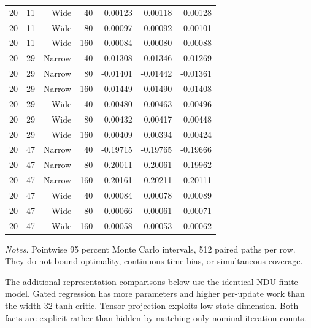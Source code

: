 \begin{small}
\begin{longtable}{lrrrrrr}
20 & 11 & Wide & 40 & 0.00123 & 0.00118 & 0.00128 \\
20 & 11 & Wide & 80 & 0.00097 & 0.00092 & 0.00101 \\
20 & 11 & Wide & 160 & 0.00084 & 0.00080 & 0.00088 \\
20 & 29 & Narrow & 40 & -0.01308 & -0.01346 & -0.01269 \\
20 & 29 & Narrow & 80 & -0.01401 & -0.01442 & -0.01361 \\
20 & 29 & Narrow & 160 & -0.01449 & -0.01490 & -0.01408 \\
20 & 29 & Wide & 40 & 0.00480 & 0.00463 & 0.00496 \\
20 & 29 & Wide & 80 & 0.00432 & 0.00417 & 0.00448 \\
20 & 29 & Wide & 160 & 0.00409 & 0.00394 & 0.00424 \\
20 & 47 & Narrow & 40 & -0.19715 & -0.19765 & -0.19666 \\
20 & 47 & Narrow & 80 & -0.20011 & -0.20061 & -0.19962 \\
20 & 47 & Narrow & 160 & -0.20161 & -0.20211 & -0.20111 \\
20 & 47 & Wide & 40 & 0.00084 & 0.00078 & 0.00089 \\
20 & 47 & Wide & 80 & 0.00066 & 0.00061 & 0.00071 \\
20 & 47 & Wide & 160 & 0.00058 & 0.00053 & 0.00062 \\
\bottomrule\end{longtable}\end{small}
\noindent\textit{Notes.} Pointwise 95 percent Monte Carlo intervals, 512 paired paths per row. They do not bound optimality, continuous-time bias, or simultaneous coverage.


The additional representation comparisons below use the identical NDU finite model. Gated regression has more parameters and higher per-update work than the width-32 tanh critic. Tensor projection exploits low state dimension. Both facts are explicit rather than hidden by matching only nominal iteration counts.

